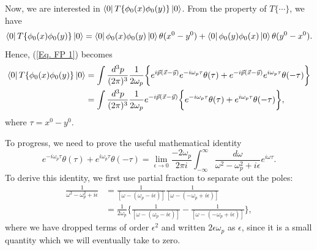 \documentclass[11pt]{article}
\theoremstyle{definition}
\begin{document}
Now, we are interested in $\bra{0}T\{\phi_0(x)\phi_0(y)\}\ket{0}$. From the property of $T\{\cdots\}$, we have
\begin{equation}
    \bra{0}T\{\phi_0(x)\phi_0(y)\}\ket{0} = \bra{0}\phi_0(x)\phi_0(y)\ket{0}\theta(x^0-y^0) + \bra{0}\phi_0(y)\phi_0(x)\ket{0}\theta(y^0-x^0).
\end{equation}
Hence, (\ref{Eq. FP 1}) becomes
\begin{equation}
\begin{aligned}
    \bra{0}T\{\phi_0(x)\phi_0(y)\}\ket{0} &= \int\frac{d^3p}{(2\pi)^3}\frac{1}{2\omega_p}\biggr\{ e^{i\vec{p}(\vec{x}-\vec{y})} e^{-i\omega_p\tau} \theta(\tau) + e^{-i\vec{p}(\vec{x}-\vec{y})} e^{i\omega_p\tau} \theta(-\tau) \biggr\} \\
    &= \int\frac{d^3p}{(2\pi)^3}\frac{1}{2\omega_p} e^{-i\vec{p}(\vec{x}-\vec{y})} \biggr\{ e^{-i\omega_p\tau} \theta(\tau) + e^{i\omega_p\tau} \theta(-\tau) \biggr\},
    \label{Eq. FP 2}
\end{aligned}
\end{equation}
where $\tau = x^0 - y^0$.

To progress, we need to prove the useful mathematical identity
\begin{equation}
    e^{-i\omega_p\tau} \theta(\tau) + e^{i\omega_p\tau} \theta(-\tau) = \lim_{\epsilon \rightarrow 0} \frac{-2\omega_p}{2\pi i} \int^\infty_{-\infty} \frac{d\omega}{\omega^2 - \omega_p^2 +i\epsilon} e^{i\omega \tau}.
    \label{Eq. FP identity}
\end{equation}
To derive this identity, we first use partial fraction to separate out the poles:
\begin{equation}
\begin{aligned}
        \frac{1}{\omega^2 - \omega_p^2 +i\epsilon} &= \frac{1}{[\omega - (\omega_p -i\epsilon)]} \frac{1}{[\omega - (-\omega_p + i\epsilon)]} \\
        &= \frac{1}{2 \omega_p}\biggr\{ \frac{1}{[\omega - (\omega_p -i\epsilon)]} - \frac{1}{[\omega - (-\omega_p + i\epsilon)]} \biggr\},
\end{aligned}
\end{equation}
where we have dropped terms of order $\epsilon^2$ and written $2\epsilon\omega_p$ as $\epsilon$, since it is a small quantity which we will eventually take to zero.
\end{document}
